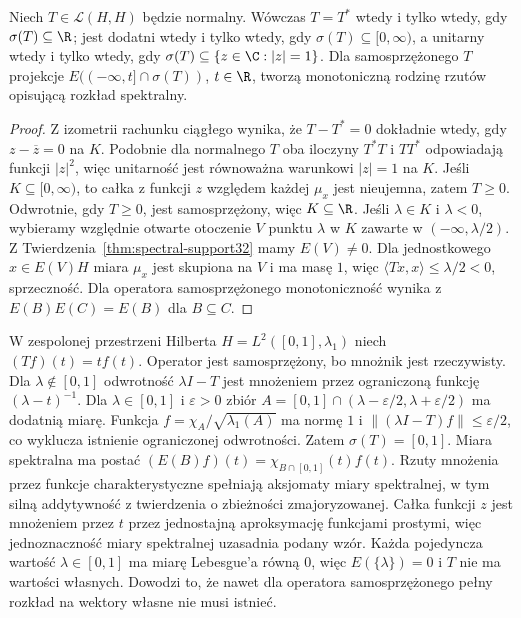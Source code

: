 \begin{wniosek}
\label{cor:spectral-types32}
Niech $T\in\mathcal L(H,H)$ będzie normalny.
Wówczas $T=T^*$ wtedy i tylko wtedy, gdy
$\sigma(T)\subseteq\R$; jest dodatni wtedy i tylko wtedy, gdy
$\sigma(T)\subseteq[0,\infty)$, a unitarny wtedy i tylko wtedy,
gdy $\sigma(T)\subseteq\{z\in\C:|z|=1\}$.
Dla samosprzężonego $T$ projekcje
$E(( -\infty,t]\cap\sigma(T))$, $t\in\R$, tworzą
monotoniczną rodzinę rzutów opisującą rozkład spektralny.
\end{wniosek}
\begin{proof}
Z izometrii rachunku ciągłego wynika, że $T-T^*=0$
dokładnie wtedy, gdy $z-\overline z=0$ na $K$.
Podobnie dla normalnego $T$ oba iloczyny $T^*T$ i $TT^*$
odpowiadają funkcji $|z|^2$, więc unitarność jest
równoważna warunkowi $|z|=1$ na $K$.
Jeśli $K\subseteq[0,\infty)$, to całka z funkcji
$z$ względem każdej $\mu_x$ jest nieujemna, zatem $T\ge0$.
Odwrotnie, gdy $T\ge0$, jest samosprzężony, więc $K\subseteq\R$.
Jeśli $\lambda\in K$ i $\lambda<0$, wybieramy względnie
otwarte otoczenie $V$ punktu $\lambda$ w $K$ zawarte
w $(-\infty,\lambda/2)$. Z Twierdzenia~\ref{thm:spectral-support32}
mamy $E(V)\ne0$. Dla jednostkowego $x\in E(V)H$ miara
$\mu_x$ jest skupiona na $V$ i ma masę $1$, więc
$\langle Tx,x\rangle\le\lambda/2<0$, sprzeczność.
Dla operatora samosprzężonego monotoniczność wynika z
$E(B)E(C)=E(B)$ dla $B\subseteq C$.
\end{proof}

\begin{przyklad}
\label{ex:mult-spectrum32}
W zespolonej przestrzeni Hilberta $H=L^2([0,1],\lambda_1)$
niech $(Tf)(t)=tf(t)$. Operator jest samosprzężony,
bo mnożnik jest rzeczywisty. Dla $\lambda\notin[0,1]$
odwrotność $\lambda I-T$ jest mnożeniem przez
ograniczoną funkcję $(\lambda-t)^{-1}$.
Dla $\lambda\in[0,1]$ i $\varepsilon>0$ zbiór
$A=[0,1]\cap(\lambda-\varepsilon/2,\lambda+\varepsilon/2)$
ma dodatnią miarę. Funkcja
$f=\chi_A/\sqrt{\lambda_1(A)}$ ma normę $1$ i
$\|(\lambda I-T)f\|\le\varepsilon/2$, co wyklucza
istnienie ograniczonej odwrotności.
Zatem $\sigma(T)=[0,1]$. Miara spektralna ma postać
$(E(B)f)(t)=\chi_{B\cap[0,1]}(t)f(t)$.
Rzuty mnożenia przez funkcje charakterystyczne
spełniają aksjomaty miary spektralnej, w tym silną
addytywność z twierdzenia o zbieżności zmajoryzowanej.
Całka funkcji $z$ jest mnożeniem przez $t$ przez
jednostajną aproksymację funkcjami prostymi, więc
jednoznaczność miary spektralnej uzasadnia podany wzór.
Każda pojedyncza wartość $\lambda\in[0,1]$ ma miarę Lebesgue'a
równą $0$, więc $E(\{\lambda\})=0$ i $T$ nie ma wartości
własnych. Dowodzi to, że nawet dla operatora samosprzężonego
pełny rozkład na wektory własne nie musi istnieć.
\end{przyklad}

